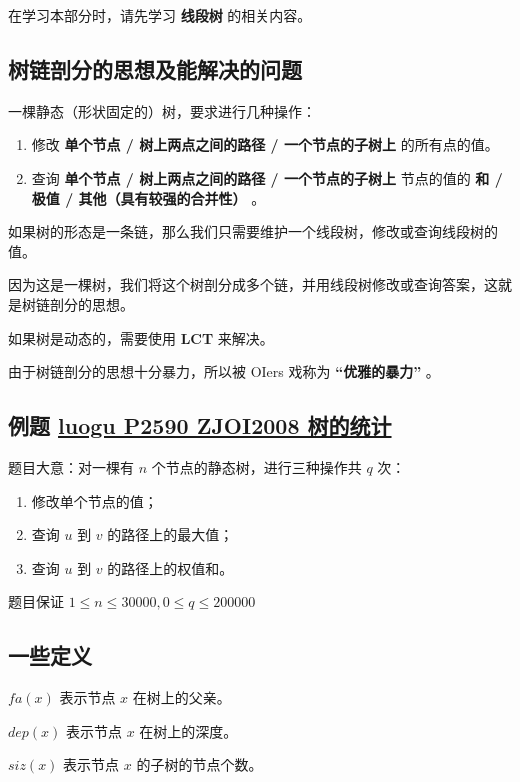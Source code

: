 
在学习本部分时，请先学习 \textbf{ 线段树 } 的相关内容。

\subsection{树链剖分的思想及能解决的问题}

一棵静态（形状固定的）树，要求进行几种操作：

\begin{enumerate}
\item 修改 \textbf{单个节点 / 树上两点之间的路径 / 一个节点的子树上} 的所有点的值。
\item 查询 \textbf{单个节点 / 树上两点之间的路径 / 一个节点的子树上} 节点的值的 \textbf{和 / 极值 / 其他（具有较强的合并性）} 。
\end{enumerate}

如果树的形态是一条链，那么我们只需要维护一个线段树，修改或查询线段树的值。

因为这是一棵树，我们将这个树剖分成多个链，并用线段树修改或查询答案，这就是树链剖分的思想。

如果树是动态的，需要使用 \textbf{LCT} 来解决。

由于树链剖分的思想十分暴力，所以被 OIers 戏称为 \textbf{“优雅的暴力”} 。

\subsection{例题 \href{https://www.luogu.org/problemnew/show/P2590}{luogu P2590 ZJOI2008  树的统计}}

题目大意：对一棵有 $n$ 个节点的静态树，进行三种操作共 $q$ 次：

\begin{enumerate}
\item 修改单个节点的值；
\item 查询 $u$ 到 $v$ 的路径上的最大值；
\item 查询 $u$ 到 $v$ 的路径上的权值和。
\end{enumerate}

题目保证 $1\le n\le 30000,0\le q\le 200000$

\subsection{一些定义}

$fa(x)$ 表示节点 $x$ 在树上的父亲。

$dep(x)$ 表示节点 $x$ 在树上的深度。

$siz(x)$ 表示节点 $x$ 的子树的节点个数。


